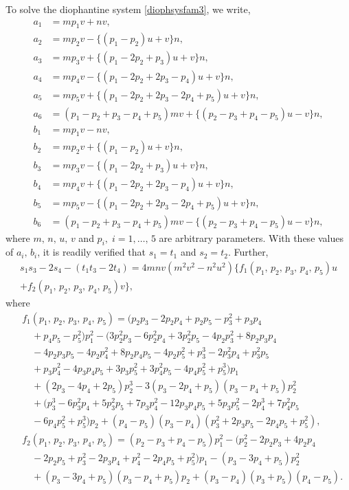 \documentclass[11pt, leqno]{article}
\begin{document}
To solve the diophantine system \eqref{diophsysfam3}, we write,
\begin{equation}
\begin{aligned}
a_1 &= mp_1v+nv, \\
a_2 &= mp_2v-\{(p_1-p_2)u+v\}n, \\
a_3 &= mp_3v+\{(p_1-2p_2+p_3)u+v\}n,\\
 a_4 &= mp_4v-\{(p_1-2p_2+2p_3-p_4)u+v\}n, \\
a_5 &= mp_5v+\{(p_1-2p_2+2p_3-2p_4+p_5)u+v\}n,\\
 a_6 &= (p_1-p_2+p_3-p_4+p_5)mv+\{(p_2-p_3+p_4-p_5)u-v\}n,\\
 b_1 &= mp_1v-nv, \\
b_2 &= mp_2v+\{(p_1-p_2)u+v\}n, \\
b_3 &= mp_3v-\{(p_1-2p_2+p_3)u+v\}n, \\
b_4 &= mp_4v+\{(p_1-2p_2+2p_3-p_4)u+v\}n,\\
 b_5 &= mp_5v-\{(p_1-2p_2+2p_3-2p_4+p_5)u+v\}n,\\
 b_6 &= (p_1-p_2+p_3-p_4+p_5)mv-\{(p_2-p_3+p_4-p_5)u-v\}n,
\end{aligned}
\label{subs2ecfam3}
\end{equation}
where $m,\,n,\,u,\,v$ and $p_i,\;i=1,\ldots,\,5$ are arbitrary parameters. With these values of $a_i, \, b_i$, 
 it is readily verified that $s_1=t_1$ and $s_2=t_2$. Further,
\begin{multline*}
s_1s_3-2s_4-(t_1t_3-2t_4)=4mnv(m^2v^2-n^2u^2)
\{f_1(p_1,\,p_2,\,p_3,\,p_4,\,p_5)u\\+f_2(p_1,\,p_2,\,p_3,\,p_4,\,p_5)v\}, \quad \quad \quad \quad 
\end{multline*}
where
\begin{equation}
\begin{aligned}
&f_1(p_1,\,p_2,\,p_3,\,p_4,\,p_5)=(p_2p_3-2p_2p_4+p_2p_5-p_3^2+p_3p_4\\
& \quad+p_4p_5-p_5^2)p_1^2-(3p_2^2p_3-6p_2^2p_4+3p_2^2p_5-4p_2p_3^2+8p_2p_3p_4\\
& \quad-4p_2p_3p_5-4p_2p_4^2+8p_2p_4p_5-4p_2p_5^2+p_3^3-2p_3^2p_4+p_3^2p_5\\
& \quad+p_3p_4^2-4p_3p_4p_5+3p_3p_5^2+3p_4^2p_5-4p_4p_5^2+p_5^3)p_1\\
& \quad+(2p_3-4p_4+2p_5)p_2^3-3(p_3-2p_4+p_5)(p_3-p_4+p_5)p_2^2\\
& \quad+(p_3^3-6p_3^2p_4+5p_3^2p_5+7p_3p_4^2-12p_3p_4p_5+5p_3p_5^2-2p_4^3+7p_4^2p_5\\
& \quad-6p_4p_5^2+p_5^3)p_2+(p_4-p_5)(p_3-p_4)(p_3^2+2p_3p_5-2p_4p_5+p_5^2),\\
&f_2(p_1,\,p_2,\,p_3,\,p_4,\,p_5)=(p_2-p_3+p_4-p_5)p_1^2-(p_2^2-2p_2p_3+4p_2p_4\\
& \quad-2p_2p_5+p_3^2-2p_3p_4+p_4^2-2p_4p_5+p_5^2)p_1-(p_3-3p_4+p_5)p_2^2\\
& \quad+(p_3-3p_4+p_5)(p_3-p_4+p_5)p_2+(p_3-p_4)(p_3+p_5)(p_4-p_5).
\end{aligned}
\end{equation}
\end{document}
